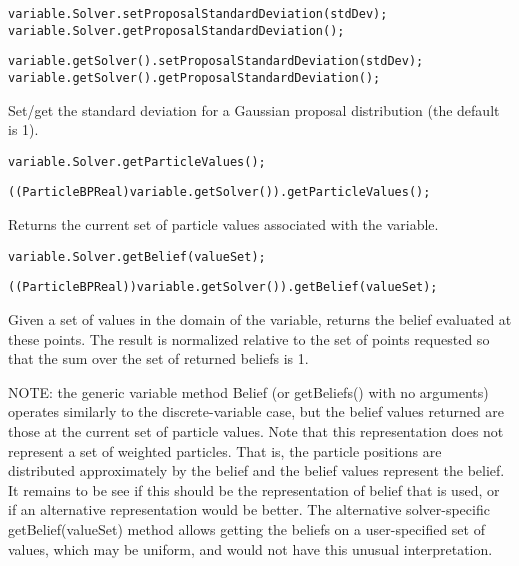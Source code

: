 \ifmatlab
\begin{lstlisting}
variable.Solver.setProposalStandardDeviation(stdDev);
variable.Solver.getProposalStandardDeviation();
\end{lstlisting}
\fi

\ifjava
\begin{lstlisting}
variable.getSolver().setProposalStandardDeviation(stdDev);
variable.getSolver().getProposalStandardDeviation();
\end{lstlisting}
\fi


Set/get the standard deviation for a Gaussian proposal distribution (the default is 1).

\ifmatlab
\begin{lstlisting}
variable.Solver.getParticleValues();
\end{lstlisting}
\fi

\ifjava
\begin{lstlisting}
((ParticleBPReal)variable.getSolver()).getParticleValues();
\end{lstlisting}
\fi

Returns the current set of particle values associated with the variable.

\ifmatlab
\begin{lstlisting}
variable.Solver.getBelief(valueSet);
\end{lstlisting}
\fi

\ifjava
\begin{lstlisting}
((ParticleBPReal))variable.getSolver()).getBelief(valueSet);
\end{lstlisting}
\fi

Given a set of values in the domain of the variable, returns the belief evaluated at these points. The result is normalized relative to the set of points requested so that the sum over the set of returned beliefs is 1.

NOTE: the generic variable method Belief (or getBeliefs() with no arguments) operates similarly to the discrete-variable case, but the belief values returned are those at the current set of particle values. Note that this representation does not represent a set of weighted particles. That is, the particle positions are distributed approximately by the belief and the belief values represent the belief. It remains to be see if this should be the representation of belief that is used, or if an alternative representation would be better. The alternative solver-specific getBelief(valueSet) method allows getting the beliefs on a user-specified set of values, which may be uniform, and would not have this unusual interpretation.


